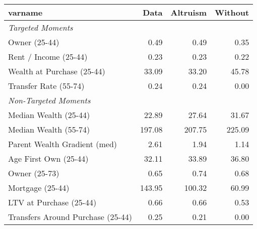 \begin{tabular}{lrrr}
\toprule
varname & Data & Altruism & Without\\
\midrule
\textit{Targeted Moments} &  &  & \\
\;Owner (25-44) & 0.49 & 0.49 & 0.35\\
\;Rent / Income (25-44) & 0.23 & 0.23 & 0.22\\
\;Wealth at Purchase (25-44) & 33.09 & 33.20 & 45.78\\
\;Transfer Rate (55-74) & 0.24 & 0.24 & 0.00\\
\textit{Non-Targeted Moments} &  &  & \\
\;Median Wealth (25-44) & 22.89 & 27.64 & 31.67\\
\;Median Wealth (55-74) & 197.08 & 207.75 & 225.09\\
\;Parent Wealth Gradient (med) & 2.61 & 1.94 & 1.14\\
\;Age First Own (25-44) & 32.11 & 33.89 & 36.80\\
\;Owner (25-73) & 0.65 & 0.74 & 0.68\\
\;Mortgage (25-44) & 143.95 & 100.32 & 60.99\\
\;LTV at Purchase (25-44) & 0.66 & 0.66 & 0.53\\
\;Transfers Around Purchase (25-44) & 0.25 & 0.21 & 0.00\\
\bottomrule
\end{tabular}
